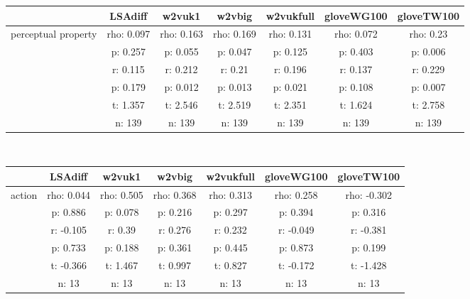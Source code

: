 \documentclass{article}
\begin{document}
\begin{tabular}{ccccccc|}\cline{2-7}
&\multicolumn{1}{|c}{LSAdiff} & w2vuk1 & w2vbig & w2vukfull & gloveWG100 & gloveTW100 \\\hline
\multicolumn{1}{|c|}{\multirow{6}{*}{perceptual property}} & rho: 0.097 & rho: 0.163 & rho: 0.169 & rho: 0.131 & rho: 0.072 & rho: 0.23 \\
\multicolumn{1}{|c|}{} & p: 0.257 & p: 0.055 & p: 0.047 & p: 0.125 & p: 0.403 & p: 0.006 \\
\multicolumn{1}{|c|}{} & r: 0.115 & r: 0.212 & r: 0.21 & r: 0.196 & r: 0.137 & r: 0.229 \\
\multicolumn{1}{|c|}{} & p: 0.179 & p: 0.012 & p: 0.013 & p: 0.021 & p: 0.108 & p: 0.007 \\
\multicolumn{1}{|c|}{} & t: 1.357 & t: 2.546 & t: 2.519 & t: 2.351 & t: 1.624 & t: 2.758 \\
\multicolumn{1}{|c|}{} & n: 139 & n: 139 & n: 139 & n: 139 & n: 139 & n: 139 \\
\hline
\end{tabular}\\
\begin{tabular}{ccccccc|}\cline{2-7}
&\multicolumn{1}{|c}{LSAdiff} & w2vuk1 & w2vbig & w2vukfull & gloveWG100 & gloveTW100 \\\hline
\multicolumn{1}{|c|}{\multirow{6}{*}{action}} & rho: 0.044 & rho: 0.505 & rho: 0.368 & rho: 0.313 & rho: 0.258 & rho: -0.302 \\
\multicolumn{1}{|c|}{} & p: 0.886 & p: 0.078 & p: 0.216 & p: 0.297 & p: 0.394 & p: 0.316 \\
\multicolumn{1}{|c|}{} & r: -0.105 & r: 0.39 & r: 0.276 & r: 0.232 & r: -0.049 & r: -0.381 \\
\multicolumn{1}{|c|}{} & p: 0.733 & p: 0.188 & p: 0.361 & p: 0.445 & p: 0.873 & p: 0.199 \\
\multicolumn{1}{|c|}{} & t: -0.366 & t: 1.467 & t: 0.997 & t: 0.827 & t: -0.172 & t: -1.428 \\
\multicolumn{1}{|c|}{} & n: 13 & n: 13 & n: 13 & n: 13 & n: 13 & n: 13 \\
\hline
\end{tabular}\\
\end{document}

